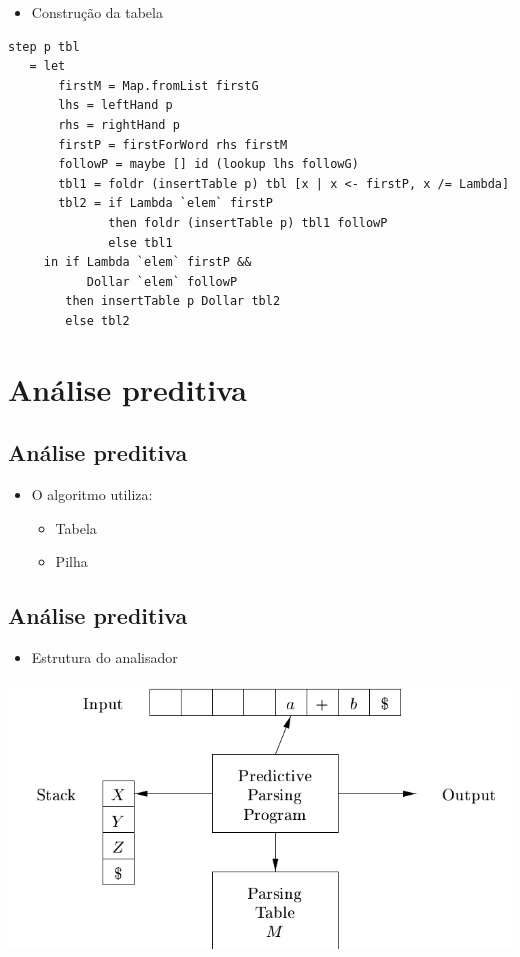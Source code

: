 \documentclass[11pt]{article}
\begin{document}
\begin{itemize}
\item Construção da tabela
\end{itemize}

\begin{verbatim}
step p tbl
   = let 
       firstM = Map.fromList firstG
       lhs = leftHand p
       rhs = rightHand p
       firstP = firstForWord rhs firstM
       followP = maybe [] id (lookup lhs followG)
       tbl1 = foldr (insertTable p) tbl [x | x <- firstP, x /= Lambda]
       tbl2 = if Lambda `elem` firstP
              then foldr (insertTable p) tbl1 followP
              else tbl1
     in if Lambda `elem` firstP &&
           Dollar `elem` followP
        then insertTable p Dollar tbl2
        else tbl2
\end{verbatim}
\section*{Análise preditiva}
\label{sec:org353258d}

\subsection*{Análise preditiva}
\label{sec:org6787e49}

\begin{itemize}
\item O algoritmo utiliza:
\begin{itemize}
\item Tabela
\item Pilha
\end{itemize}
\end{itemize}
\subsection*{Análise preditiva}
\label{sec:orgc6240f9}

\begin{itemize}
\item Estrutura do analisador
\end{itemize}

\begin{center}
\includegraphics[width=.9\linewidth]{./imgs/predictive.png}
\end{center}
\end{document}
